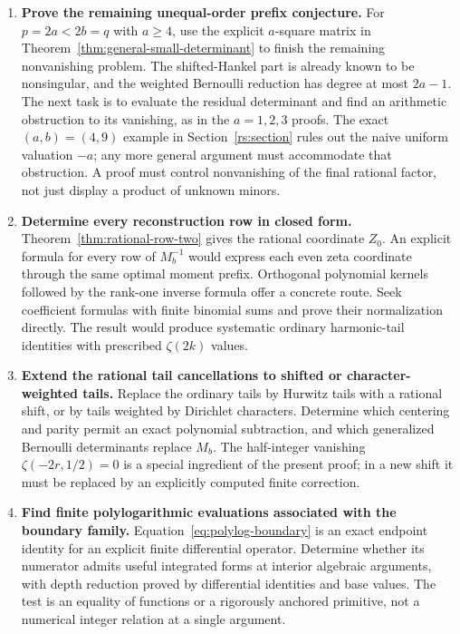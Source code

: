 \documentclass[11pt,a4paper]{article}
\numberwithin{equation}{section}
\theoremstyle{plain}
\theoremstyle{definition}
\theoremstyle{remark}
\begin{document}
\begin{enumerate}[leftmargin=*,label=\textbf{R\arabic*.}]
\item \textbf{Prove the remaining unequal-order prefix conjecture.}
For $p=2a<2b=q$ with $a\ge4$, use the explicit $a$-square matrix
in Theorem~\ref{thm:general-small-determinant} to finish the remaining
nonvanishing problem. The shifted-Hankel part is already known to be
nonsingular, and the weighted Bernoulli reduction has degree at most
$2a-1$. The next task is to evaluate the residual determinant and find
an arithmetic obstruction to its vanishing, as in the $a=1,2,3$ proofs. The exact $(a,b)=(4,9)$ example
in Section~\ref{rs:section} rules out the naive uniform valuation $-a$;
any more general argument must accommodate that obstruction.
A proof must control
nonvanishing of the final rational factor, not just display a product of
unknown minors.

\item \textbf{Determine every reconstruction row in closed form.}
Theorem~\ref{thm:rational-row-two} gives the rational coordinate $Z_0$.
An explicit formula for every row of $M_b^{-1}$ would express each even
zeta coordinate through the same optimal moment prefix. Orthogonal
polynomial kernels followed by the rank-one inverse formula offer a
concrete route. Seek coefficient formulas with finite binomial sums and
prove their normalization directly. The result would produce systematic
ordinary harmonic-tail identities with prescribed $\zeta(2k)$ values.

\item \textbf{Extend the rational tail cancellations to shifted or
character-weighted tails.}
Replace the ordinary tails by Hurwitz tails with a rational shift, or
by tails weighted by Dirichlet characters. Determine which centering and
parity permit an exact polynomial subtraction, and which generalized
Bernoulli determinants replace $M_b$. The half-integer vanishing
$\zeta(-2r,1/2)=0$ is a special ingredient of the present proof; in a new
shift it must be replaced by an explicitly computed finite correction.

\item \textbf{Find finite polylogarithmic evaluations associated with
the boundary family.}
Equation~\eqref{eq:polylog-boundary} is an exact endpoint identity for
an explicit finite differential operator. Determine whether its numerator
admits useful integrated forms at interior algebraic arguments, with
depth reduction proved by differential identities and base values.
The test is an equality of functions or a rigorously anchored primitive,
not a numerical integer relation at a single argument.


\end{enumerate}
\end{document}
